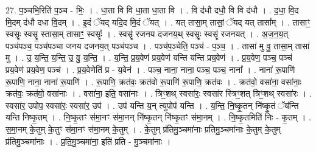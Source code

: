 \documentclass[17pt]{extarticle}
\begin{document}
27. प॒ञ्चभि॒रिति॑ प॒ञ्च - भिः॒ । . धा॒ता वि वि धा॒ता धा॒ता वि । . वि द॑धौ दधौ॒ वि वि द॑धौ । . द॒धा॒ वि॒द मि॒दम् द॑धौ दधा वि॒दम् । . इ॒दं ॅयद् यदि॒द मि॒दं ॅयत् । . यत् तासा॒म् तासां॒ ॅयद् यत् तासा᳚म् । . तासाꣳ॒॒ स्वसॄः॒ स्वसॄ॒ स्तासा॒म् तासाꣳ॒॒ स्वसॄः᳚ । . स्वसॄ॑ रजनय दजनय॒थ् स्वसॄः॒ स्वसॄ॑ रजनयत् । . अ॒ज॒न॒य॒त् पञ्च॑पञ्च॒ पञ्च॑पञ्चा जनय दजनय॒त् पञ्च॑पञ्च । . पञ्च॑प॒ञ्चेति॒ पञ्च॑ - प॒ञ्च॒ । . तासा॑ मु वु॒ तासा॒म् तासा॑ मु । . उ॒ य॒न्ति॒ य॒न्ति॒ उ॒ वु॒ य॒न्ति॒ । . य॒न्ति॒ प्र॒य॒वेण॑ प्रय॒वेण॑ यन्ति यन्ति प्रय॒वेण॑ । . प्र॒य॒वेण॒ पञ्च॒ पञ्च॑ प्रय॒वेण॑ प्रय॒वेण॒ पञ्च॑ । . प्र॒य॒वेणेति॑ प्र - य॒वेन॑ । . पञ्च॒ नाना॒ नाना॒ पञ्च॒ पञ्च॒ नाना᳚ । . नाना॑ रू॒पाणि॑ रू॒पाणि॒ नाना॒ नाना॑ रू॒पाणि॑ । . रू॒पाणि॒ क्रत॑वः॒ क्रत॑वो रू॒पाणि॑ रू॒पाणि॒ क्रत॑वः । . क्रत॑वो॒ वसा॑ना॒ वसा॑नाः॒ क्रत॑वः॒ क्रत॑वो॒ वसा॑नाः । . वसा॑ना॒ इति॒ वसा॑नाः । . त्रिꣳ॒॒शथ् स्वसा॑रः॒ स्वसा॑र स्त्रिꣳ॒॒शत् त्रिꣳ॒॒शथ् स्वसा॑रः । . स्वसा॑र॒ उपोप॒ स्वसा॑रः॒ स्वसा॑र॒ उप॑ । . उप॑ यन्ति य॒न् त्युपोप॑ यन्ति । . य॒न्ति॒ नि॒ष्कृ॒तन् नि॑ष्कृ॒तं ॅय॑न्ति यन्ति निष्कृ॒तम् । . नि॒ष्कृ॒तꣳ स॑मा॒नꣳ स॑मा॒नन् नि॑ष्कृ॒तन् नि॑ष्कृ॒तꣳ स॑मा॒नम् । . नि॒ष्कृ॒तमिति॑ निः - कृ॒तम् । . स॒मा॒नम् के॒तुम् के॒तुꣳ स॑मा॒नꣳ स॑मा॒नम् के॒तुम् । . के॒तुम् प्र॑तिमु॒ञ्चमा॑नाः प्रतिमु॒ञ्चमा॑नाः के॒तुम् के॒तुम् प्र॑तिमु॒ञ्चमा॑नाः । . प्र॒ति॒मु॒ञ्चमा॑ना॒ इति॑ प्रति - मु॒ञ्चमा॑नाः । \newline
\end{document}

